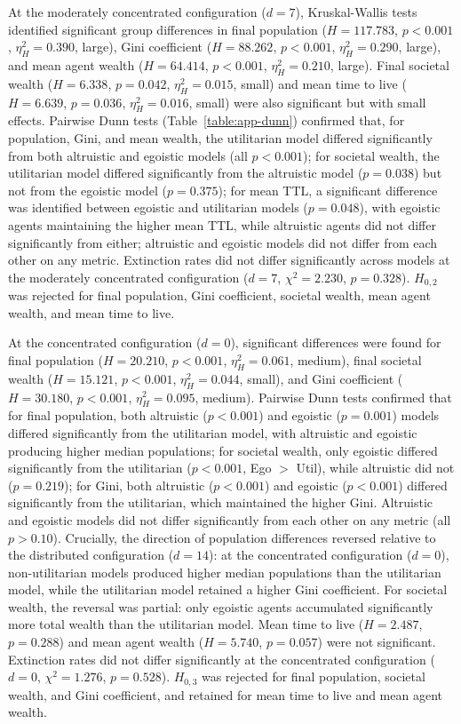 \documentclass{icsthesis}
\begin{document}
\begin{mainmatter}
At the moderately concentrated configuration ($d = 7$), Kruskal-Wallis tests identified significant group differences in final population ($H = 117.783$, $p < 0.001$, $\eta^2_H = 0.390$, large), Gini coefficient ($H = 88.262$, $p < 0.001$, $\eta^2_H = 0.290$, large), and mean agent wealth ($H = 64.414$, $p < 0.001$, $\eta^2_H = 0.210$, large). Final societal wealth ($H = 6.338$, $p = 0.042$, $\eta^2_H = 0.015$, small) and mean time to live ($H = 6.639$, $p = 0.036$, $\eta^2_H = 0.016$, small) were also significant but with small effects. Pairwise Dunn tests (Table~\ref{table:app-dunn}) confirmed that, for population, Gini, and mean wealth, the utilitarian model differed significantly from both altruistic and egoistic models (all $p < 0.001$); for societal wealth, the utilitarian model differed significantly from the altruistic model ($p = 0.038$) but not from the egoistic model ($p = 0.375$); for mean TTL, a significant difference was identified between egoistic and utilitarian models ($p = 0.048$), with egoistic agents maintaining the higher mean TTL, while altruistic agents did not differ significantly from either; altruistic and egoistic models did not differ from each other on any metric. Extinction rates did not differ significantly across models at the moderately concentrated configuration ($d = 7$, $\chi^2 = 2.230$, $p = 0.328$). $H_{0,2}$ was rejected for final population, Gini coefficient, societal wealth, mean agent wealth, and mean time to live.

At the concentrated configuration ($d = 0$), significant differences were found for final population ($H = 20.210$, $p < 0.001$, $\eta^2_H = 0.061$, medium), final societal wealth ($H = 15.121$, $p < 0.001$, $\eta^2_H = 0.044$, small), and Gini coefficient ($H = 30.180$, $p < 0.001$, $\eta^2_H = 0.095$, medium). Pairwise Dunn tests confirmed that for final population, both altruistic ($p < 0.001$) and egoistic ($p = 0.001$) models differed significantly from the utilitarian model, with altruistic and egoistic producing higher median populations; for societal wealth, only egoistic differed significantly from the utilitarian ($p < 0.001$, Ego $>$ Util), while altruistic did not ($p = 0.219$); for Gini, both altruistic ($p < 0.001$) and egoistic ($p < 0.001$) differed significantly from the utilitarian, which maintained the higher Gini. Altruistic and egoistic models did not differ significantly from each other on any metric (all $p > 0.10$). Crucially, the direction of population differences reversed relative to the distributed configuration ($d = 14$): at the concentrated configuration ($d = 0$), non-utilitarian models produced higher median populations than the utilitarian model, while the utilitarian model retained a higher Gini coefficient. For societal wealth, the reversal was partial: only egoistic agents accumulated significantly more total wealth than the utilitarian model. Mean time to live ($H = 2.487$, $p = 0.288$) and mean agent wealth ($H = 5.740$, $p = 0.057$) were not significant. Extinction rates did not differ significantly at the concentrated configuration ($d = 0$, $\chi^2 = 1.276$, $p = 0.528$). $H_{0,3}$ was rejected for final population, societal wealth, and Gini coefficient, and retained for mean time to live and mean agent wealth.


\end{mainmatter}
\end{document}

